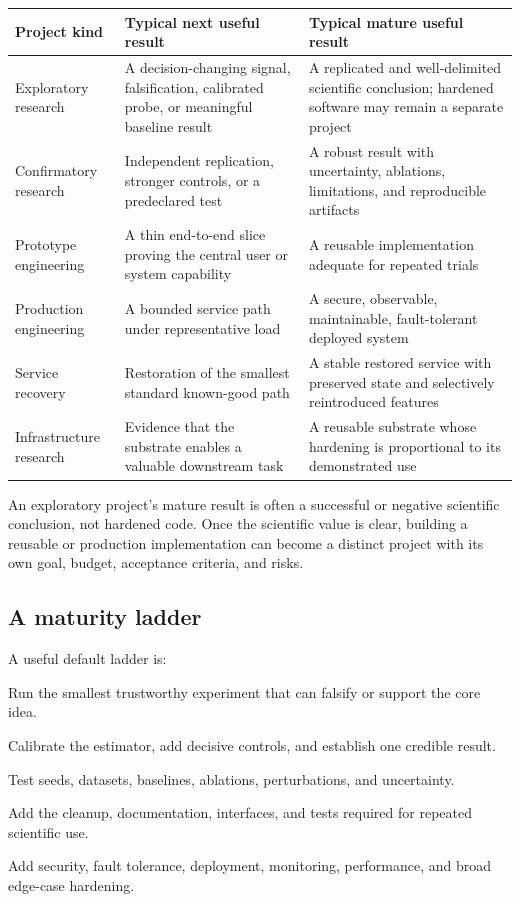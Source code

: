 \documentclass[11pt,letterpaper]{article}
\begin{document}
\begin{longtable}{p{}p{}p{}}
\toprule
Project kind & Typical next useful result & Typical mature useful result \\
\midrule
\endhead
Exploratory research & A decision-changing signal, falsification, calibrated
probe, or meaningful baseline result & A replicated and well-delimited
scientific conclusion; hardened software may remain a separate project \\
Confirmatory research & Independent replication, stronger controls, or a
predeclared test & A robust result with uncertainty, ablations, limitations,
and reproducible artifacts \\
Prototype engineering & A thin end-to-end slice proving the central user or
system capability & A reusable implementation adequate for repeated trials \\
Production engineering & A bounded service path under representative load & A
secure, observable, maintainable, fault-tolerant deployed system \\
Service recovery & Restoration of the smallest standard known-good path & A
stable restored service with preserved state and selectively reintroduced
features \\
Infrastructure research & Evidence that the substrate enables a valuable
downstream task & A reusable substrate whose hardening is proportional to its
demonstrated use \\
\bottomrule
\end{longtable}

An exploratory project's mature result is often a successful or negative
scientific conclusion, not hardened code. Once the scientific value is clear,
building a reusable or production implementation can become a distinct project
with its own goal, budget, acceptance criteria, and risks.

\subsection{A maturity ladder}

A useful default ladder is:

\begin{description}[style=nextline]
  \item[E0 -- Exploration]
    Run the smallest trustworthy experiment that can falsify or support the
    core idea.
  \item[E1 -- Signal validation]
    Calibrate the estimator, add decisive controls, and establish one credible
    result.
  \item[E2 -- Replication and robustness]
    Test seeds, datasets, baselines, ablations, perturbations, and uncertainty.
  \item[E3 -- Reusable research implementation]
    Add the cleanup, documentation, interfaces, and tests required for repeated
    scientific use.
  \item[E4 -- Production engineering]
    Add security, fault tolerance, deployment, monitoring, performance, and
    broad edge-case hardening.
\end{description}
\end{document}
